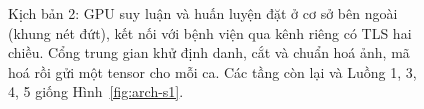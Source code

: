 \begin{figure}
\centering
\resizebox{\linewidth}{!}{}
\caption{Kịch bản 2: GPU suy luận và huấn luyện đặt ở cơ sở bên ngoài (khung nét đứt),
kết nối với bệnh viện qua kênh riêng có TLS hai chiều. Cổng trung gian khử định danh, cắt
và chuẩn hoá ảnh, mã hoá rồi gửi một tensor cho mỗi ca. Các tầng còn lại và Luồng 1, 3,
4, 5 giống Hình~\ref{fig:arch-s1}.}
\label{fig:arch-s2}
\end{figure}
